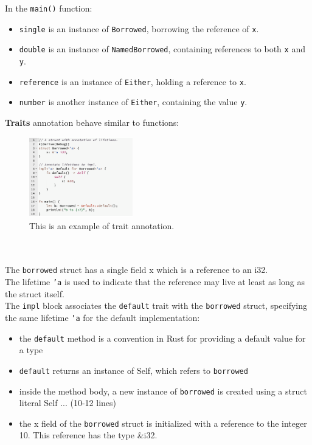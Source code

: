 \documentclass{article}
\begin{document}
In the \texttt{main()} function:
\begin{itemize}
    \item \texttt{single} is an instance of \texttt{Borrowed}, borrowing the reference of \texttt{x}.
    \item \texttt{double} is an instance of \texttt{NamedBorrowed}, containing references to both \texttt{x} and \texttt{y}.
    \item \texttt{reference} is an instance of \texttt{Either}, holding a reference to \texttt{x}.
    \item \texttt{number} is another instance of \texttt{Either}, containing the value \texttt{y}.
\end{itemize}
\textbf{Traits} annotation behave similar to functions:
\begin{figure}[h]
  \centering
  \includegraphics[width=0.4\textwidth]{images/traits_lifetime.png} 
  \caption{This is an example of trait annotation.}
  \label{fig:trait_annotation_example}
\end{figure}
\\
\\
The \texttt{borrowed} struct has a single field x which is a reference to an i32.\\The lifetime \texttt{'a} is used to indicate that the reference may live at least as long as the struct itself.\\
The \texttt{impl} block associates the \texttt{default} trait with the \texttt{borrowed} struct, specifying the same lifetime \texttt{'a} for the default implementation: 
\begin{itemize}
    \item the \texttt{default} method is a convention in Rust for providing a default value for a type
    \item \texttt{default} returns an instance of Self, which refers to \texttt{borrowed}
    \item inside the method body, a new instance of \texttt{borrowed} is created using a struct literal Self { ... }(10-12 lines)
    \item the x field of the \texttt{borrowed} struct is initialized with a reference to the integer 10. This reference has the type \&i32.
\end{itemize}
\end{document}
